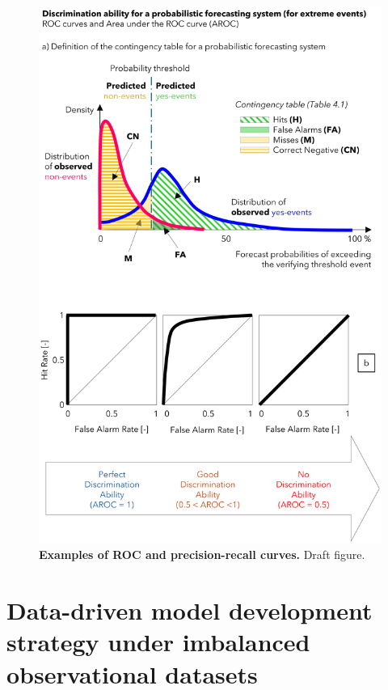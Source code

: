 \begin{figure}[htbp]
\centering
\includegraphics[width=\textwidth]{roc_examples.png}
\caption{\textbf{Examples of ROC and precision-recall curves.} Draft figure.}
\label{fig:roc_examples}
\end{figure}

\section{Data-driven model development strategy under imbalanced observational datasets}
\label{experimental_design_model_dev_imbalanced_data}

